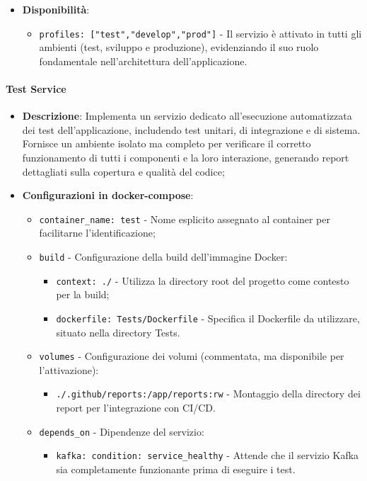 \documentclass[10pt]{article}
\begin{document}
\begin{itemize}
        \item \textbf{Disponibilità}:
        \begin{itemize}
            \item \texttt{profiles: ["test","develop","prod"]} - Il servizio è attivato in tutti gli ambienti (test, sviluppo e produzione), evidenziando il suo ruolo fondamentale nell'architettura dell'applicazione.
        \end{itemize}
        \end{itemize}

        \paragraph{Test Service}
        \begin{itemize} 
        \item \textbf{Descrizione}: Implementa un servizio dedicato all'esecuzione automatizzata dei test dell'applicazione, includendo test unitari, di integrazione e di sistema. Fornisce un ambiente isolato ma completo per verificare il corretto funzionamento di tutti i componenti e la loro interazione, generando report dettagliati sulla copertura e qualità del codice;
        \item \textbf{Configurazioni in docker-compose}:
        \begin{itemize}
            \item \texttt{container\_name: test} - Nome esplicito assegnato al container per facilitarne l'identificazione;
            \item \texttt{build} - Configurazione della build dell'immagine Docker:
            \begin{itemize}
                \item \texttt{context: ./} - Utilizza la directory root del progetto come contesto per la build;
                \item \texttt{dockerfile: Tests/Dockerfile} - Specifica il Dockerfile da utilizzare, situato nella directory Tests.
            \end{itemize}
            \item \texttt{volumes} - Configurazione dei volumi (commentata, ma disponibile per l'attivazione):
            \begin{itemize}
                \item \texttt{./.github/reports:/app/reports:rw} - Montaggio della directory dei report per l'integrazione con CI/CD.
            \end{itemize}
            \item \texttt{depends\_on} - Dipendenze del servizio:
            \begin{itemize}
                \item \texttt{kafka: condition: service\_healthy} - Attende che il servizio Kafka sia completamente funzionante prima di eseguire i test.
            \end{itemize}
        \end{itemize}
        

\end{itemize}
\end{document}
